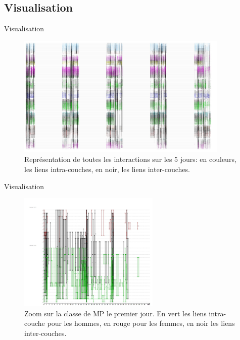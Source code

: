 \documentclass[15pt]{beamer}
\begin{document}
\subsection{Visualisation}
\begin{frame}{Visualisation}
    \begin{figure}
        \centering
        \includegraphics[width=0.9\textwidth]{img/lyceeentier.JPG}
        \caption{Représentation de toutes les interactions sur les 5 jours: en couleurs, les liens intra-couches, en noir, les liens inter-couches.}
        \label{lyceeentier}
    \end{figure}
\end{frame}

\begin{frame}{Visualisation}
    \begin{figure}
        \centering
        \includegraphics[width=0.6\textwidth]{img/1jourMP.JPG}
        \caption{\og Zoom \fg{} sur la classe de MP le premier jour. En vert les liens intra-couche pour les hommes, en rouge pour les femmes, en noir les liens inter-couches.}
        \label{fig:my_label}
    \end{figure}
\end{frame}
\end{document}
